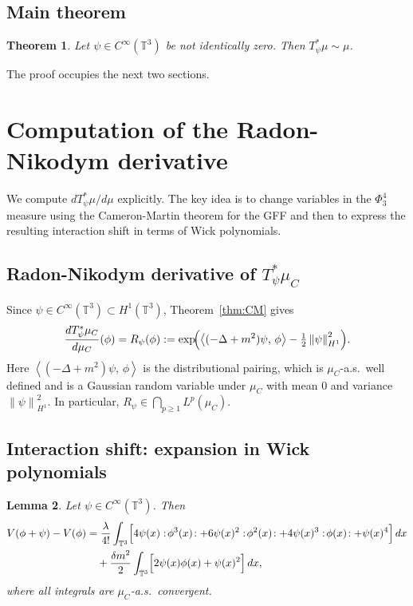 \documentclass[12pt]{article}
\newtheorem{theorem}{Theorem}[section]
\newtheorem{lemma}[theorem]{Lemma}
\newcommand{\T}{\mathbb{T}}
\newcommand{\norm}[1]{\left\|#1\right\|}
\newcommand{\ip}[2]{\left\langle #1,\, #2 \right\rangle}
\newcommand{\wick}[1]{:\!#1\!:}
\begin{document}
\subsection{Main theorem}

\begin{theorem}\label{thm:main}
Let $\psi\in C^\infty(\T^3)$ be not identically zero.  Then $T_\psi^*\mu\sim\mu$.
\end{theorem}

The proof occupies the next two sections.

\section{Computation of the Radon-Nikodym derivative}

We compute $dT_\psi^*\mu/d\mu$ explicitly.  The key idea is to change variables in the
$\Phi^4_3$ measure using the Cameron-Martin theorem for the GFF and then to express the
resulting interaction shift in terms of Wick polynomials.

\subsection{Radon-Nikodym derivative of $T_\psi^*\mu_C$}

Since $\psi\in C^\infty(\T^3)\subset H^1(\T^3)$, Theorem~\ref{thm:CM} gives
\begin{equation}\label{eq:GaussRN}
  \frac{dT_\psi^*\mu_C}{d\mu_C}(\phi)
  = R_\psi(\phi) := \exp\!\Bigl(\ip{(-\Delta+m^2)\psi}{\phi} - \tfrac{1}{2}\norm{\psi}_{H^1}^2\Bigr).
\end{equation}
Here $\ip{(-\Delta+m^2)\psi}{\phi}$ is the distributional pairing, which is
$\mu_C$-a.s.\ well defined and is a Gaussian random variable under $\mu_C$ with mean $0$ and
variance $\norm{\psi}_{H^1}^2$.  In particular, $R_\psi\in\bigcap_{p\ge 1}L^p(\mu_C)$.

\subsection{Interaction shift: expansion in Wick polynomials}

\begin{lemma}\label{lem:VexpansionWick}
Let $\psi\in C^\infty(\T^3)$.  Then
\begin{align}
  V(\phi+\psi) - V(\phi)
  &= \frac{\lambda}{4!}\int_{\T^3}
     \Bigl[
       4\psi(x)\wick{\phi^3(x)}
       + 6\psi(x)^2\wick{\phi^2(x)}
       + 4\psi(x)^3\wick{\phi(x)}
       + \psi(x)^4
     \Bigr]\,dx \notag\\
  &\quad + \frac{\delta m^2}{2}\int_{\T^3}
     \Bigl[2\psi(x)\phi(x) + \psi(x)^2\Bigr]\,dx, \label{eq:Vshift}
\end{align}
where all integrals are $\mu_C$-a.s.\ convergent.
\end{lemma}
\end{document}
